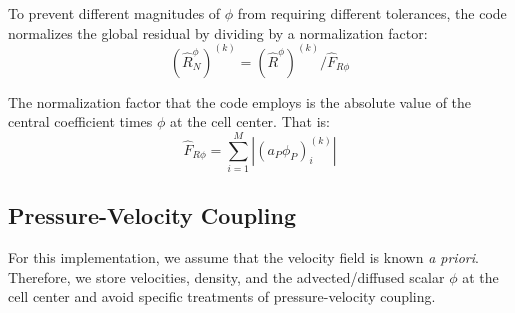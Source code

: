 \documentclass{article}
\newcommand{\lp}{\left(}
\newcommand{\rp}{\right)}
\begin{document}
To prevent different magnitudes of $\phi$ from requiring different tolerances, the code normalizes the global residual by dividing by a normalization factor:
\begin{equation}
    \lp \hat{R}_N^{\phi} \rp^{\lp k\rp} = \lp \hat{R}^{\phi} \rp^{\lp k\rp}/ \hat{F}_{R\phi}
\end{equation}

The normalization factor that the code employs is the absolute value of the central coefficient times $\phi$ at the cell center. That is:
\begin{equation}
    \hat{F}_{R\phi} = \sum_{i=1}^M \left|\lp a_P\phi_P \rp_i^{\lp k \rp} \right|
\end{equation}

\subsection{Pressure-Velocity Coupling}
For this implementation, we assume that the velocity field is known \textit{a priori}. Therefore, we store velocities, density, and the advected/diffused scalar $\phi$ at the cell center and avoid specific treatments of pressure-velocity coupling.
\medskip



\end{document}
